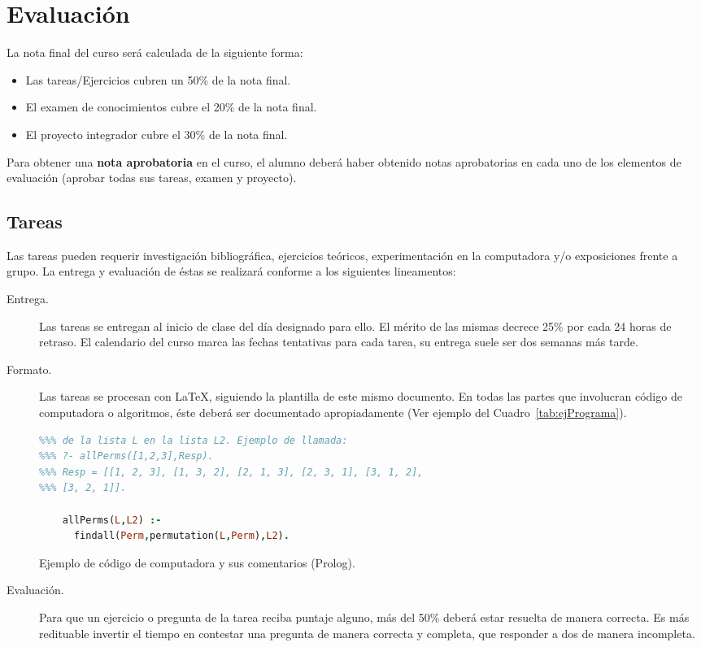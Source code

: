 \documentclass[10pt]{article}
\begin{document}
\section{Evaluación}

La nota final del curso será calculada de la siguiente forma:

\begin{itemize}
\item Las tareas/Ejercicios cubren un 50\% de la nota final.
\item El examen de conocimientos cubre el 20\% de la nota final.
\item El proyecto integrador cubre el 30\% de la nota final.
\end{itemize}

Para obtener una \textbf{nota aprobatoria} en el curso, el alumno
deberá haber obtenido notas aprobatorias en cada uno de los elementos
de evaluación (aprobar todas sus tareas, examen y proyecto).

\subsection{Tareas}

Las tareas pueden requerir investigación bibliográfica, ejercicios
teóricos, experimentación en la computadora y/o exposiciones frente a
grupo.  La entrega y evaluación de éstas se realizará conforme a los
siguientes lineamentos:

\begin{description}
\item[Entrega.] Las tareas se entregan al inicio de clase del día
  designado para ello. El mérito de las mismas decrece 25\% por cada
  24 horas de retraso. El calendario del curso marca las fechas
  tentativas para cada tarea, su entrega suele ser dos semanas más
  tarde.
\item[Formato.] Las tareas se procesan con \LaTeX, siguiendo la
  plantilla de este mismo documento. En todas las partes que
  involucran código de computadora o algoritmos, éste deberá ser
  documentado apropiadamente (Ver ejemplo del
  Cuadro~\ref{tab:ejPrograma}).

  \begin{table}
\begin{lstlisting}[language=Prolog]
%%% allPerms computa todas las permutaciones de los elementos
%%% de la lista L en la lista L2. Ejemplo de llamada:
%%% ?- allPerms([1,2,3],Resp).
%%% Resp = [[1, 2, 3], [1, 3, 2], [2, 1, 3], [2, 3, 1], [3, 1, 2],
%%% [3, 2, 1]].

    allPerms(L,L2) :-
      findall(Perm,permutation(L,Perm),L2).
\end{lstlisting}
    \caption{Ejemplo de código de computadora y sus comentarios (Prolog).}
    \label{tab:ejPrograma}
  \end{table}
  
\item[Evaluación.] Para que un ejercicio o pregunta de la tarea reciba
  puntaje alguno, más del 50\% deberá estar resuelta de manera
  correcta. Es más redituable invertir el tiempo en contestar una
  pregunta de manera correcta y completa, que responder a dos de
  manera incompleta.
\end{description}
\end{document}
